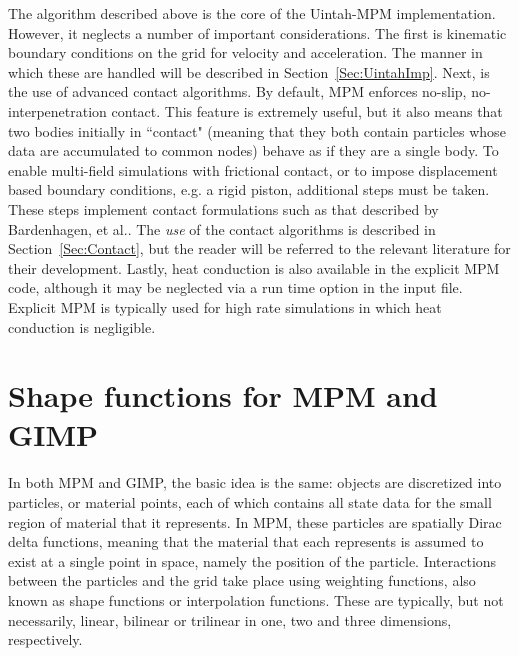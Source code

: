 The algorithm described above is the core of the Uintah-MPM implementation.
However, it neglects a number of important considerations.  The first is
kinematic boundary conditions on the grid for velocity and acceleration.
The manner in which these are handled will be described in
Section~\ref{Sec:UintahImp}.  Next, is the use of advanced contact
algorithms.  By default, MPM enforces no-slip, no-interpenetration contact.
This feature is extremely useful, but it also means that two bodies initially
in ``contact" (meaning that they both contain particles whose data are
accumulated to common nodes) behave as if they are a single body.  To enable
multi-field simulations with frictional contact, or to impose displacement
based boundary conditions, e.g. a rigid piston, additional steps must be
taken.  These steps implement contact formulations such as that described
by Bardenhagen, et al.\cite{bard_contact}.  The {\it use} of the contact
algorithms is described in Section~\ref{Sec:Contact}, but the reader will be
referred to the relevant literature for their development.  Lastly, heat
conduction is also available in the explicit MPM code, although it may be
neglected via a run time option in the input file.  Explicit MPM is typically
used for high rate simulations in which heat conduction is negligible.

\section{Shape functions for MPM and GIMP} \label{gimp_mpm}

In both MPM and GIMP, the basic idea is the same: objects are discretized into
particles, or material points, each of which contains all state data for the
small region of material that it represents.  In MPM, these particles are spatially
Dirac delta functions, meaning that the material that each represents is
assumed to exist at a single point in space, namely the position of the
particle.  Interactions between the particles and the grid take place
using weighting functions, also known as shape functions or interpolation
functions.  These are typically, but not necessarily, linear, bilinear or
trilinear in one, two and three dimensions, respectively.

